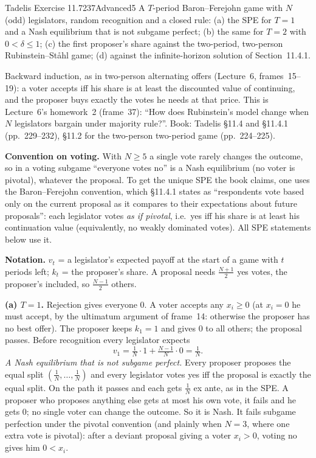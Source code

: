 \begin{exsol}{Tadelis Exercise 11.7}{237}{Advanced}{5}
\asked A $T$-period Baron--Ferejohn game with $N$ (odd) legislators, random recognition and a closed
rule: (a) the SPE for $T = 1$ and a Nash equilibrium that is not subgame perfect; (b) the same for
$T = 2$ with $0 < \delta \le 1$; (c) the first proposer's share against the two-period, two-person
Rubinstein--St\aa hl game; (d) against the infinite-horizon solution of Section~11.4.1.

\method Backward induction, as in two-person alternating offers (Lecture~6, frames~15--19): a voter
accepts iff his share is at least the discounted value of continuing, and the proposer buys exactly
the votes he needs at that price. This is Lecture~6's homework~2 (frame~37): ``How does Rubinstein's
model change when $N$ legislators bargain under majority rule?''. Book: Tadelis \S11.4 and \S11.4.1
(pp.~229--232), \S11.2 for the two-person two-period game (pp.~224--225).

\textbf{Convention on voting.} With $N \ge 5$ a single vote rarely changes the outcome, so in a voting
subgame ``everyone votes no'' is a Nash equilibrium (no voter is pivotal), whatever the proposal. To get
the unique SPE the book claims, one uses the Baron--Ferejohn convention, which \S11.4.1 states as
``respondents vote based only on the current proposal as it compares to their expectations about
future proposals'': each legislator votes \emph{as if pivotal}, i.e.\ yes iff his share is at least his
continuation value (equivalently, no weakly dominated votes). All SPE statements below use it.

\solution
\textbf{Notation.} $v_t$ = a legislator's expected payoff at the start of a game with $t$ periods left;
$k_t$ = the proposer's share. A proposal needs $\frac{N+1}{2}$ yes votes, the proposer's included, so
$\frac{N-1}{2}$ others.

\textbf{(a) $T = 1$.} Rejection gives everyone $0$. A voter accepts any $x_i \ge 0$ (at $x_i = 0$ he must
accept, by the ultimatum argument of frame~14: otherwise the proposer has no best offer). The proposer
keeps $k_1 = 1$ and gives $0$ to all others; the proposal passes. Before recognition every legislator
expects
\[
  v_1 = \tfrac1N \cdot 1 + \tfrac{N-1}{N}\cdot 0 = \tfrac1N .
\]
\emph{A Nash equilibrium that is not subgame perfect.} Every proposer proposes the equal split
$(\frac1N, \dots, \frac1N)$ and every legislator votes yes iff the proposal is exactly the equal split.
On the path it passes and each gets $\frac1N$ ex ante, as in the SPE. A proposer who proposes anything
else gets at most his own vote, it fails and he gets $0$; no single voter can change the outcome. So it
is Nash. It fails subgame perfection under the pivotal convention (and plainly when $N = 3$, where one
extra vote is pivotal): after a deviant proposal giving a voter $x_i > 0$, voting no gives him $0 < x_i$.


\end{exsol}
